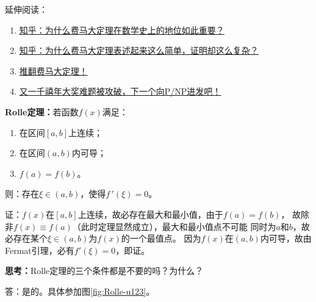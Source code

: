 \begin{shaded}
	延伸阅读：
	\begin{enumerate}[1.]
	  \setlength{\itemindent}{1cm}
	  \item \href{https://www.zhihu.com/question/19817376/answer/13071198}
	  {知乎：为什么费马大定理在数学史上的地位如此重要？}
	  \item \href{https://www.zhihu.com/question/22642790/answer/22144770}
	  {知乎：为什么费马大定理表述起来这么简单，证明却这么复杂？}
	  \item \href{http://blog.sina.com.cn/s/blog_6029f0330102w7pk.html}
	  {推翻费马大定理！}
	  \item \href{http://www.ituring.com.cn/article/67148}
	  {又一千禧年大奖难题被攻破，下一个向P/NP进发吧！}
	\end{enumerate}
\end{shaded}

\begin{thx}
	{\bf Rolle定理：}若函数$f(x)$满足：
	\begin{enumerate}[(1)]
	  \item 在区间$[a,b]$上连续；
	  \item 在区间$(a,b)$内可导；
	  \item $f(a)=f(b)$。
	\end{enumerate}
	则：存在$\xi\in(a,b)$，使得$f\,'(\xi)=0$。
\end{thx}

证：$f(x)$在$[a,b]$上连续，故必存在最大和最小值，由于$f(a)=f(b)$，
故除非$f(x)\equiv f(a)$（此时定理显然成立），最大和最小值点不可能
同时为$a$和$b$，故必存在某个$\xi\in(a,b)$为$f(x)$的一个最值点。
因为$f(x)$在$(a,b)$内可导，故由Fermat引理，必有$f'(\xi)=0$，即证。\fin

\bs
{\bf 思考：}Rolle定理的三个条件都是不要的吗？为什么？

\ifhint
答：是的。具体参加图\ref{fig:Rolle-u123}。
\fi

